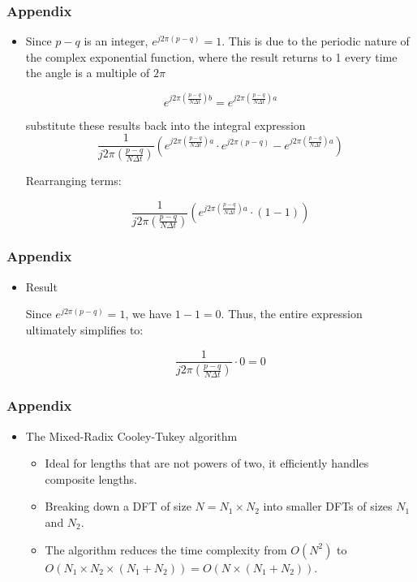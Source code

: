 \documentclass[xcolor=dvipsnames]{beamer} %
\begin{document}
\begin{frame}
\frametitle{Appendix}
\begin{itemize}
  \item Since \(p - q\) is an integer, \(e^{j2\pi (p-q)} = 1\). This is due to the periodic nature of the complex exponential function, where the result returns to 1 every time the angle is a multiple of \(2\pi\)
  
    \[
    e^{j2\pi \left( \frac{p-q}{N\Delta t} \right) b} = e^{j2\pi \left( \frac{p-q}{N\Delta t} \right) a}
    \]

    substitute these results back into the integral expression
    \[
    \frac{1}{j2\pi \left( \frac{p-q}{N\Delta t} \right)} \left( e^{j2\pi \left( \frac{p-q}{N\Delta t} \right) a} \cdot e^{j2\pi (p-q)} - e^{j2\pi \left( \frac{p-q}{N\Delta t} \right) a} \right)
    \]


    Rearranging terms:

     \[
    \frac{1}{j2\pi \left( \frac{p-q}{N\Delta t} \right)} \left( e^{j2\pi \left( \frac{p-q}{N\Delta t} \right) a} \cdot (1 - 1) \right)
    \]


\end{itemize}
\end{frame}
\begin{frame}
\frametitle{Appendix}
\begin{itemize}
  \item Result
  
  Since \(e^{j2\pi (p-q)} = 1\), we have \(1 - 1 = 0\). Thus, the entire expression ultimately simplifies to:


    \[
    \frac{1}{j2\pi \left( \frac{p-q}{N\Delta t} \right)} \cdot 0 = 0
    \]

\end{itemize}
\end{frame}


\begin{frame}
\frametitle{Appendix}
\setlength{\itemsep}{8pt}
\begin{itemize}
          
    \item The Mixed-Radix Cooley-Tukey algorithm
    \begin{itemize}
        \setlength{\itemsep}{4pt}
        \item Ideal for lengths that are not powers of two, it efficiently handles composite lengths.
        \item Breaking down a DFT of size $N = N_1 \times N_2$ into smaller DFTs of sizes $N_1$ and $N_2$.
        \item The algorithm reduces the time complexity from \(O(N^2)\) to \(O\left(N_1 \times N_2 \times (N_1 + N_2)\right) = O(N \times (N_1 + N_2))\).
    \end{itemize}
 
\end{itemize}
\end{frame}
\end{document}
